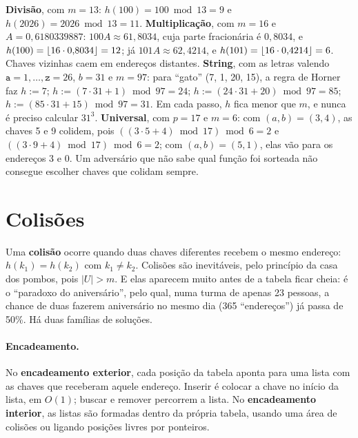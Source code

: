 \begin{exemplo}\label{ex:enderecos}
\textbf{Divisão}, com $m=13$: $h(100)=100\bmod13=9$ e $h(2026)=2026\bmod13=11$.
\textbf{Multiplicação}, com $m=16$ e $A=0{,}6180339887$: $100A\approx61{,}8034$, cuja parte fracionária é $0{,}8034$, e $h(100)=\lfloor16\cdot0{,}8034\rfloor=12$; já $101A\approx62{,}4214$, e $h(101)=\lfloor16\cdot0{,}4214\rfloor=6$. Chaves vizinhas caem em endereços distantes.
\textbf{String}, com as letras valendo $\mathtt a=1,\dots,\mathtt z=26$, $b=31$ e $m=97$: para ``gato'' (7, 1, 20, 15), a regra de Horner faz $h:=7$; $h:=(7\cdot31+1)\bmod97=24$; $h:=(24\cdot31+20)\bmod97=85$; $h:=(85\cdot31+15)\bmod97=31$. Em cada passo, $h$ fica menor que $m$, e nunca é preciso calcular $31^3$.
\textbf{Universal}, com $p=17$ e $m=6$: com $(a,b)=(3,4)$, as chaves 5 e 9 colidem, pois $((3\cdot5+4)\bmod17)\bmod6=2$ e $((3\cdot9+4)\bmod17)\bmod6=2$; com $(a,b)=(5,1)$, elas vão para os endereços 3 e 0. Um adversário que não sabe qual função foi sorteada não consegue escolher chaves que colidam sempre.
\end{exemplo}

\section{Colisões}\label{sec:colisoes}
Uma \textbf{colisão} ocorre quando duas chaves diferentes recebem o mesmo endereço: $h(k_1)=h(k_2)$ com $k_1\ne k_2$. Colisões são inevitáveis, pelo princípio da casa dos pombos, pois $|U|>m$. E elas aparecem muito antes de a tabela ficar cheia: é o ``paradoxo do aniversário'', pelo qual, numa turma de apenas 23 pessoas, a chance de duas fazerem aniversário no mesmo dia (365 ``endereços'') já passa de 50\%. Há duas famílias de soluções.

\paragraph{Encadeamento.} No \textbf{encadeamento exterior}, cada posição da tabela aponta para uma lista com as chaves que receberam aquele endereço. Inserir é colocar a chave no início da lista, em $O(1)$; buscar e remover percorrem a lista. No \textbf{encadeamento interior}, as listas são formadas dentro da própria tabela, usando uma área de colisões ou ligando posições livres por ponteiros.

